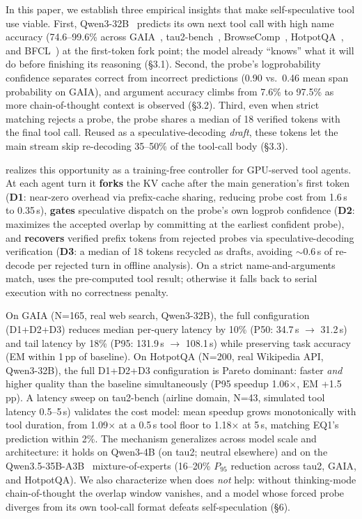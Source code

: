 In this paper, we establish three empirical insights that make self-speculative tool use
viable.
First, Qwen3-32B~\citep{yang_qwen3_2025} predicts its own next tool call with high name accuracy (74.6--99.6\%
across GAIA~\citep{mialon_gaia_2024}, tau2-bench~\citep{barres_tau2_2025},
BrowseComp~\citep{wei_browsecomp_2025}, HotpotQA~\citep{yang_hotpotqa_2018}, and
BFCL~\citep{patil_bfcl_2025}) at the first-token fork point; the model already
``knows'' what it will do before finishing its reasoning (\S3.1).
Second, the probe's logprobability confidence separates correct from incorrect predictions
(0.90 vs.\ 0.46 mean span probability on GAIA), and argument accuracy climbs from 7.6\% to
97.5\% as more chain-of-thought context is observed (\S3.2).
Third, even when strict matching rejects a probe, the probe shares a median of 18 verified
tokens with the final tool call. Reused as a speculative-decoding \emph{draft}, these
tokens let the main stream skip re-decoding 35--50\% of the tool-call body (\S3.3).

\spork{} realizes this opportunity as a training-free controller for GPU-served tool
agents.
At each agent turn it \textbf{forks} the KV cache after the main generation's first token
(\textbf{D1}: near-zero overhead via prefix-cache sharing, reducing probe cost from 1.6\,s
to 0.35\,s), \textbf{gates} speculative dispatch on the probe's own logprob confidence
(\textbf{D2}: maximizes the accepted overlap by committing at the earliest confident
probe), and \textbf{recovers} verified prefix tokens from rejected probes via
speculative-decoding verification (\textbf{D3}: a median of 18 tokens recycled as drafts,
avoiding $\sim$0.6\,s of re-decode per rejected turn in offline analysis).
On a strict name-and-arguments match, \spork{} uses the pre-computed tool result;
otherwise it falls back to serial execution with no correctness penalty.

On GAIA (N=165, real web search, Qwen3-32B), the full \spork{} configuration (D1+D2+D3)
reduces median per-query latency by 10\% (P50: 34.7\,s $\to$ 31.2\,s) and tail latency by
18\% (P95: 131.9\,s $\to$ 108.1\,s) while preserving task accuracy (EM within 1\,pp of
baseline).
On HotpotQA (N=200, real Wikipedia API, Qwen3-32B), the full D1+D2+D3 configuration is
Pareto dominant: faster \emph{and} higher quality than the baseline simultaneously (P95
speedup 1.06$\times$, EM +1.5\,pp).
A latency sweep on tau2-bench (airline domain, N=43, simulated tool latency 0.5--5\,s) validates
the cost model: mean speedup grows monotonically with tool duration, from 1.09$\times$ at
a 0.5\,s tool floor to 1.18$\times$ at 5\,s, matching EQ1's prediction within 2\%.
The mechanism generalizes across model scale and architecture: it holds on Qwen3-4B (on
tau2; neutral elsewhere) and on
the Qwen3.5-35B-A3B~\citep{qwen_qwen35_2026} mixture-of-experts (16--20\% $P_{95}$ reduction across tau2, GAIA, and HotpotQA).
We also characterize when \spork{} does \emph{not} help: without thinking-mode
chain-of-thought the overlap window vanishes, and a model whose forced probe diverges
from its own tool-call format defeats self-speculation (\S6).

